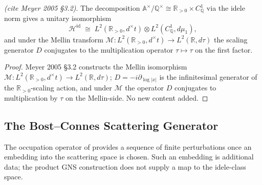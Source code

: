 \begin{lemma}
\label{v4-arith:w7-j:lem:mellin-decomp}
\ClaimStatusProvedElsewhere \emph{(cite Meyer 2005 \S3.2)}.
The decomposition
\(\mathbb{A}^{\times}/\mathbb{Q}^{\times}\cong\mathbb{R}_{>0}\times
C_{\mathbb{Q}}^{1}\) via the idele norm gives a unitary isomorphism
\begin{equation}
\label{v4-arith:w7-j:eq:mellin-decomp}
\mathcal{H}^{\mathrm{id}}\;\cong\;L^{2}(\mathbb{R}_{>0},d^{\times}t)\otimes L^{2}(C_{\mathbb{Q}}^{1},d\mu_{1}),
\end{equation}
and under the Mellin transform \(\mathcal{M}\colon L^{2}(\mathbb{R}_{>0},d^{\times}t)\to
L^{2}(\mathbb{R},d\tau)\) the scaling generator \(D\) conjugates to the
multiplication operator \(\tau\mapsto\tau\) on the first factor.
\end{lemma}

\begin{proof}
Meyer 2005 \S3.2 constructs the Mellin isomorphism
\(\mathcal{M}: L^{2}(\mathbb{R}_{>0},d^{\times}t) \to
L^{2}(\mathbb{R},d\tau)\); \(D = -i\partial_{\log|x|}\) is the
infinitesimal generator of the \(\mathbb{R}_{>0}\)-scaling action,
and under \(\mathcal{M}\) the operator \(D\) conjugates to
multiplication by \(\tau\) on the Mellin-side. No new content added.
\end{proof}

\subsection{The Bost--Connes Scattering Generator}
\label{v4-arith:w7-j:framework:generator}

The occupation operator of 
provides a sequence of finite perturbations once an embedding into the
scattering space is chosen. Such an embedding is additional data; the
product GNS construction does not supply a map to the idele-class space.

